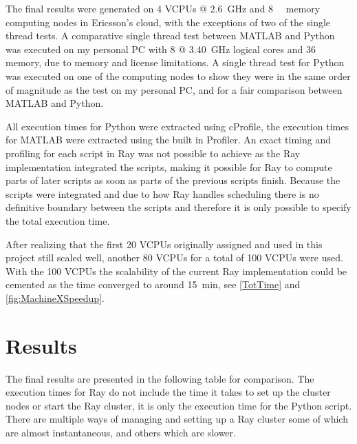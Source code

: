 \documentclass[12pt, a4paper]{article}
\begin{document}
The final results were generated on 4 VCPUs @ \SI{2.6}{\giga\hertz} and \SI{8}{\giga\byte} memory computing nodes in Ericsson's cloud, with the exceptions of two of the single thread tests.
A comparative single thread test between MATLAB and Python was executed on my personal PC with 8 @ \SI{3.40}{\giga\hertz} logical cores and \SI{36}{\giga\byte} memory, due to memory and license limitations. 
A single thread test for Python was executed on one of the computing nodes to show they were in the same order of magnitude as the test on my personal PC, and for a fair comparison between MATLAB and Python.

All execution times for Python were extracted using cProfile, the execution times for MATLAB were extracted using the built in Profiler.
An exact timing and profiling for each script in Ray was not possible to achieve as the Ray implementation integrated the scripts, making it possible for Ray to compute parts of later scripts as soon as parts of the previous scripts finish.
Because the scripts were integrated and due to how Ray handles scheduling there is no definitive boundary between the scripts and therefore it is only possible to specify the total execution time.

After realizing that the first 20 VCPUs originally assigned and used in this project still scaled well, another 80 VCPUs for a total of 100 VCPUs were used. With the 100 VCPUs the scalability of the current Ray implementation could be cemented as the time converged to around \SI{15}{\minute}, see \cref{TotTime} and \cref{fig:MachineXSpeedup}.

\section{Results}

The final results are presented in the following table for comparison.
The execution times for Ray do not include the time it takes to set up the cluster nodes or start the Ray cluster, it is only the execution time for the Python script.
There are multiple ways of managing and setting up a Ray cluster some of which are almost instantaneous, and others which are slower. 
\end{document}
